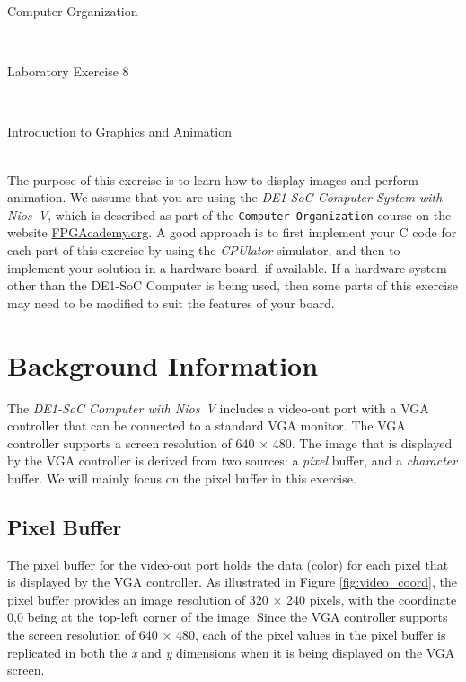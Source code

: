 \documentclass[epsfig,10pt,fullpage]{article}
\newcommand{\LabNum}{8}
\begin{document}
\centerline{\huge Computer Organization}
~\\
\centerline{\huge Laboratory Exercise \LabNum}
~\\
\centerline{\large Introduction to Graphics and Animation}
~\\

The purpose of this exercise is to learn how to display images and perform animation. 
We assume that you are using the {\it DE1-SoC Computer System with Nios~V},
which is described as part of the \texttt{Computer Organization} course on the website
{\href{https://www.fpgacademy.org/courses.html} {FPGAcademy.org}}.
A good approach is to first implement your C code for each part of this exercise by 
using the {\it CPUlator} simulator, and then to implement your solution in a hardware board,
if available.  If a hardware system other than the DE1-SoC Computer is being used, then 
some parts of this exercise may need to be modified to suit the features of your board. 

\section*{Background Information}
The {\it DE1-SoC Computer with Nios~V} includes a video-out port with a VGA
controller that can be connected to a standard VGA monitor. The VGA controller supports
a screen resolution of 640 $\times$ 480. The image that is displayed by the VGA controller is
derived from two sources: a {\it pixel} buffer, and a {\it character} buffer. We will 
mainly focus on the pixel buffer in this exercise. 

\subsection*{Pixel Buffer}
\label{sec:pixel_buffer}
The pixel buffer for the video-out port holds the data (color) for each pixel that is 
displayed by the VGA controller.  As illustrated in Figure \ref{fig:video_coord}, the
pixel buffer provides an image resolution of 
320 $\times$ 240 pixels, with the coordinate 0,0 being at the top-left corner of the image. 
Since the VGA controller supports the screen resolution of 640 $\times$ 480, each of the
pixel values in
the pixel buffer is replicated in both the {\it x} and {\it y} dimensions when it is being
displayed on the VGA screen.
\end{document}
